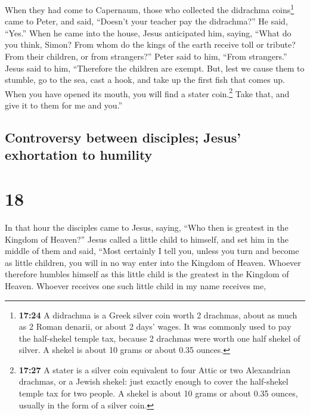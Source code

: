  When they had come to Capernaum, those who collected the
didrachma coins\footnote{\textbf{17:24} A didrachma is a Greek silver
  coin worth 2 drachmas, about as much as 2 Roman denarii, or about 2
  days' wages. It was commonly used to pay the half-shekel temple tax,
  because 2 drachmas were worth one half shekel of silver. A shekel is
  about 10 grams or about 0.35 ounces.} came to Peter, and said,
``Doesn't your teacher pay the didrachma?''  He said,
``Yes.'' When he came into the house, Jesus anticipated him, saying,
``What do you think, Simon? From whom do the kings of the earth receive
toll or tribute? From their children, or from strangers?''
 Peter said to him, ``From strangers.'' Jesus said to
him, ``Therefore the children are exempt.  But, lest we
cause them to stumble, go to the sea, cast a hook, and take up the first
fish that comes up. When you have opened its mouth, you will find a
stater coin.\footnote{\textbf{17:27} A stater is a silver coin
  equivalent to four Attic or two Alexandrian drachmas, or a Jewish
  shekel: just exactly enough to cover the half-shekel temple tax for
  two people. A shekel is about 10 grams or about 0.35 ounces, usually
  in the form of a silver coin.} Take that, and give it to them for me
and you.''

\hypertarget{controversy-between-disciples-jesus-exhortation-to-humility}{%
\subsection{Controversy between disciples; Jesus' exhortation to
humility}\label{controversy-between-disciples-jesus-exhortation-to-humility}}

\hypertarget{section-17}{%
\section{18}\label{section-17}}

 In that hour the disciples came to Jesus, saying, ``Who
then is greatest in the Kingdom of Heaven?''  Jesus called
a little child to himself, and set him in the middle of them
 and said, ``Most certainly I tell you, unless you turn
and become as little children, you will in no way enter into the Kingdom
of Heaven.  Whoever therefore humbles himself as this
little child is the greatest in the Kingdom of Heaven. 
Whoever receives one such little child in my name receives me,

